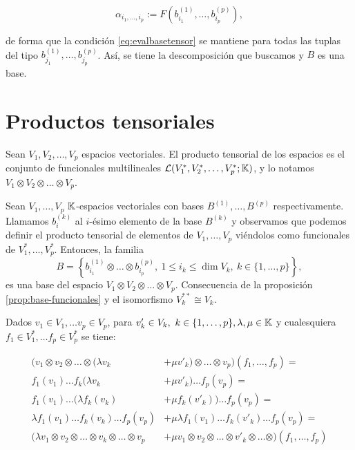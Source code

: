 \begin{equation*}
\alpha_{i_1,\dots,i_p}:=F\left(b_{i_1}^{(1)},\dots,b_{i_p}^{(p)}\right),
\end{equation*}

de forma que la condición \eqref{eq:evalbasetensor} se mantiene para
todas las tuplas del tipo \(b_{j_1}^{(1)},\dots,b_{j_p}^{(p)}\). Así, se
tiene la descomposición que buscamos y \(B\) es una base.

\proofe

\prope

\section{Productos tensoriales}\label{productos-tensoriales}

Sean \(V_1,V_2,\dots,V_p\) espacios vectoriales. El producto tensorial
de los espacios es el conjunto de funcionales multilineales
\(\mathcal{L}(V_1^*,V_2^*,\dots,V_p^*;\mathbb{K})\), y lo notamos
\(V_1\otimes V_2\otimes\dots\otimes V_p\). 

\corb
Sean \(V_1,\dots,V_p\) \(\mathbb{K}\)-espacios vectoriales con bases
\(B^{(1)},\dots,B^{(p)}\) respectivamente. Llamamos \(b_i^{(k)}\) al
\(i\)-ésimo elemento de la base \(B^{(k)}\) y observamos que podemos
definir el producto tensorial de elementos de \(V_1,\dots,V_p\)
viéndolos como funcionales de \(V_1^*,\dots,V_p^*\). Entonces, la
familia
\[B=\left\{b_{i_1}^{(1)}\otimes\dots\otimes b_{i_p}^{(p)},\ 1\leq i_k\leq\dim{V_k},\ k\in\{1,\dots,p\}\right\},\]
es una base del espacio \(V_1\otimes V_2\otimes\dots\otimes V_p\).
\proofb
Consecuencia de la proposición \ref{prop:base-funcionales} y el
isomorfismo \(V_k^{**}\cong V_k\). \proofe
\core

\remb
Dados \(v_1\in V_1,\dots v_p\in V_p\), para
\(v'_k\in V_k,\ k\in\{1,\dots,p\},\lambda,\mu\in\KK\) y cualesquiera
\(f_1\in V_1^*,\dots f_p\in V_p^*\) se tiene:

\begin{align*}
  (v_1\otimes v_2\otimes\dots\otimes(\lambda v_k &+ \mu v'_k)\otimes\dots\otimes v_p)(f_1,\dots,f_p)=\\
  f_1(v_1)\dots f_k(\lambda v_k &+ \mu v'_k) \dots f_p(v_p) =\\
  f_1(v_1)\dots (\lambda f_k(v_k) &+ \mu f_k(v'_k)) \dots f_p(v_p) = \\
  \lambda f_1(v_1)\dots f_k(v_k) \dots f_p(v_p) &+ \mu \lambda f_1(v_1)\dots f_k(v'_k) \dots f_p(v_p) =\\
  (\lambda v_1\otimes v_2\otimes\dots\otimes v_k\otimes\dots\otimes v_p &+\mu v_1\otimes v_2\otimes\dots\otimes v'_k\otimes\dots\otimes)(f_1,\dots,f_p)
\end{align*}

